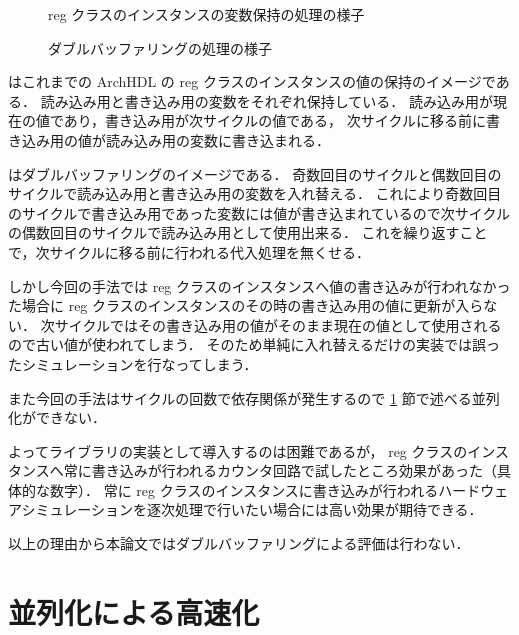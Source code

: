 \begin{figure}[t]
 \begin{center}
  
 \end{center}
 \caption{reg クラスのインスタンスの変数保持の処理の様子}
 \label{fig:reg_curr_next}
\end{figure}

\begin{figure}[t]
 \begin{center}
  
 \end{center}
 \caption{ダブルバッファリングの処理の様子}
 \label{fig:double_buffer}
\end{figure}

 はこれまでの ArchHDL の reg クラスのインスタンスの値の保持のイメージである．
読み込み用と書き込み用の変数をそれぞれ保持している．
読み込み用が現在の値であり，書き込み用が次サイクルの値である，
次サイクルに移る前に書き込み用の値が読み込み用の変数に書き込まれる．

はダブルバッファリングのイメージである．
奇数回目のサイクルと偶数回目のサイクルで読み込み用と書き込み用の変数を入れ替える．
これにより奇数回目のサイクルで書き込み用であった変数には値が書き込まれているので次サイクルの偶数回目のサイクルで読み込み用として使用出来る．
これを繰り返すことで，次サイクルに移る前に行われる代入処理を無くせる．

しかし今回の手法では reg クラスのインスタンスへ値の書き込みが行われなかった場合に
reg クラスのインスタンスのその時の書き込み用の値に更新が入らない．
次サイクルではその書き込み用の値がそのまま現在の値として使用されるので古い値が使われてしまう．
そのため単純に入れ替えるだけの実装では誤ったシミュレーションを行なってしまう．

また今回の手法はサイクルの回数で依存関係が発生するので \ref{ss:parallel} 節で述べる並列化ができない．

よってライブラリの実装として導入するのは困難であるが，
reg クラスのインスタンスへ常に書き込みが行われるカウンタ回路で試したところ効果があった（具体的な数字）．
常に reg クラスのインスタンスに書き込みが行われるハードウェアシミュレーションを逐次処理で行いたい場合には高い効果が期待できる．

以上の理由から本論文ではダブルバッファリングによる評価は行わない．

\fi

\section{並列化による高速化} \label{ss:parallel}
\fi
